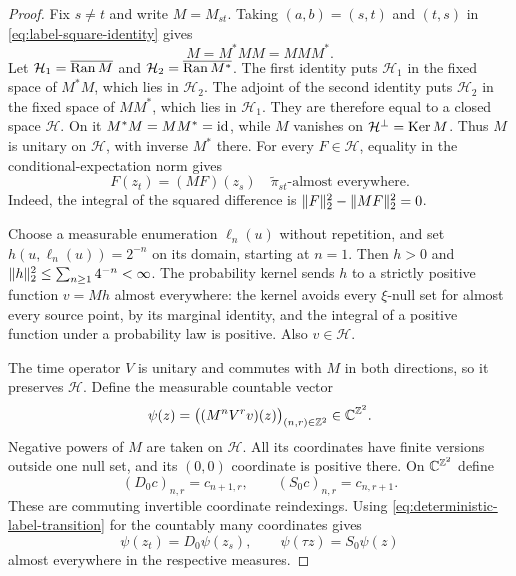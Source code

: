 \begin{proof}
Fix $s\ne t$ and write $M=M_{st}$. Taking $(a,b)=(s,t)$ and $(t,s)$
in \eqref{eq:label-square-identity} gives
\begin{equation}\label{eq:partial-unitary-identities}
 M=M^*MM=MMM^*.
\end{equation}
Let $\mathcal H_1=\overline{\operatorname{Ran} M}$ and
$\mathcal H_2=\overline{\operatorname{Ran} M^*}$.
The first identity puts $\mathcal H_1$ in the fixed space of $M^*M$,
which lies in $\mathcal H_2$. The adjoint of the second identity puts
$\mathcal H_2$ in the fixed space of $MM^*$, which lies in
$\mathcal H_1$. They are therefore equal to a closed space
$\mathcal H$. On it $M^*M=MM^*=\operatorname{id}$, while
$M$ vanishes on $\mathcal H^\perp=\operatorname{Ker} M$.
Thus $M$ is unitary on $\mathcal H$, with inverse $M^*$ there.
For every $F\in\mathcal H$, equality in the conditional-expectation
norm gives
\begin{equation}\label{eq:deterministic-label-transition}
 F(z_t)=(MF)(z_s)
 \quad\widetilde\pi_{st}\text{-almost everywhere}.
\end{equation}
Indeed, the integral of the squared difference is
$\lVert F\rVert_2^2-\lVert MF\rVert_2^2=0$.

Choose a measurable enumeration $\ell_n(u)$ without repetition, and
set $h(u,\ell_n(u))=2^{-n}$ on its domain, starting at $n=1$.
Then $h>0$ and $\lVert h\rVert_2^2\le\sum_{n\ge1}4^{-n}<\infty$.
The probability kernel sends $h$ to a strictly positive function
$v=Mh$ almost everywhere: the kernel avoids every $\xi$-null set
for almost every source point, by its marginal identity, and the
integral of a positive function under a probability law is positive.
Also $v\in\mathcal H$.

The time operator $V$ is unitary and commutes with $M$ in both
directions, so it preserves $\mathcal H$. Define the measurable
countable vector
\begin{equation}\label{eq:label-orbit-vector}
 \psi(z)=\bigl((M^nV^r v)(z)\bigr)_{(n,r)\in\mathbb Z^2}
          \in\mathbb C^{\mathbb Z^2}.
\end{equation}
Negative powers of $M$ are taken on $\mathcal H$.
All its coordinates have finite versions outside one null set, and
its $(0,0)$ coordinate is positive there. On $\mathbb C^{\mathbb Z^2}$ define
\[
 (D_0c)_{n,r}=c_{n+1,r},\qquad
 (S_0c)_{n,r}=c_{n,r+1}.
\]
These are commuting invertible coordinate reindexings.
Using \eqref{eq:deterministic-label-transition} for the countably
many coordinates gives
\begin{equation}\label{eq:psi-transports}
 \psi(z_t)=D_0\psi(z_s),\qquad
 \psi(\tau z)=S_0\psi(z)
\end{equation}
almost everywhere in the respective measures.


\end{proof}
